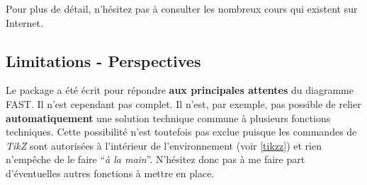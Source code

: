 		Pour plus de détail, n'hésitez pas à consulter les nombreux cours qui existent sur Internet.
		

	

	\subsection{Limitations - Perspectives}\label{limitations}

		Le package a été écrit pour répondre \textbf{aux principales attentes} du diagramme FAST.
		Il n'est cependant pas complet.
		Il n'est, par exemple, pas possible de relier \textbf{automatiquement} une solution technique commune à plusieurs fonctions techniques.
		Cette possibilité n'est toutefois pas exclue puisque les commandes de \emph{TikZ} sont autorisées à l'intérieur de l'environnement (voir \ref{tikzz}) et rien n'empêche de le faire ``\emph{à la main}''.
		N'hésitez donc pas à me faire part d'éventuelles autres fonctions à mettre en place.